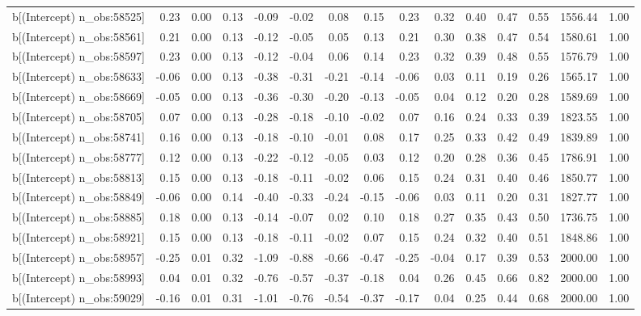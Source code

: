 \begin{table}[ht]
\begin{tabular}{rrrrrrrrrrrrrrr}
  b[(Intercept) n\_obs:58525] & 0.23 & 0.00 & 0.13 & -0.09 & -0.02 & 0.08 & 0.15 & 0.23 & 0.32 & 0.40 & 0.47 & 0.55 & 1556.44 & 1.00 \\ 
  b[(Intercept) n\_obs:58561] & 0.21 & 0.00 & 0.13 & -0.12 & -0.05 & 0.05 & 0.13 & 0.21 & 0.30 & 0.38 & 0.47 & 0.54 & 1580.61 & 1.00 \\ 
  b[(Intercept) n\_obs:58597] & 0.23 & 0.00 & 0.13 & -0.12 & -0.04 & 0.06 & 0.14 & 0.23 & 0.32 & 0.39 & 0.48 & 0.55 & 1576.79 & 1.00 \\ 
  b[(Intercept) n\_obs:58633] & -0.06 & 0.00 & 0.13 & -0.38 & -0.31 & -0.21 & -0.14 & -0.06 & 0.03 & 0.11 & 0.19 & 0.26 & 1565.17 & 1.00 \\ 
  b[(Intercept) n\_obs:58669] & -0.05 & 0.00 & 0.13 & -0.36 & -0.30 & -0.20 & -0.13 & -0.05 & 0.04 & 0.12 & 0.20 & 0.28 & 1589.69 & 1.00 \\ 
  b[(Intercept) n\_obs:58705] & 0.07 & 0.00 & 0.13 & -0.28 & -0.18 & -0.10 & -0.02 & 0.07 & 0.16 & 0.24 & 0.33 & 0.39 & 1823.55 & 1.00 \\ 
  b[(Intercept) n\_obs:58741] & 0.16 & 0.00 & 0.13 & -0.18 & -0.10 & -0.01 & 0.08 & 0.17 & 0.25 & 0.33 & 0.42 & 0.49 & 1839.89 & 1.00 \\ 
  b[(Intercept) n\_obs:58777] & 0.12 & 0.00 & 0.13 & -0.22 & -0.12 & -0.05 & 0.03 & 0.12 & 0.20 & 0.28 & 0.36 & 0.45 & 1786.91 & 1.00 \\ 
  b[(Intercept) n\_obs:58813] & 0.15 & 0.00 & 0.13 & -0.18 & -0.11 & -0.02 & 0.06 & 0.15 & 0.24 & 0.31 & 0.40 & 0.46 & 1850.77 & 1.00 \\ 
  b[(Intercept) n\_obs:58849] & -0.06 & 0.00 & 0.14 & -0.40 & -0.33 & -0.24 & -0.15 & -0.06 & 0.03 & 0.11 & 0.20 & 0.31 & 1827.77 & 1.00 \\ 
  b[(Intercept) n\_obs:58885] & 0.18 & 0.00 & 0.13 & -0.14 & -0.07 & 0.02 & 0.10 & 0.18 & 0.27 & 0.35 & 0.43 & 0.50 & 1736.75 & 1.00 \\ 
  b[(Intercept) n\_obs:58921] & 0.15 & 0.00 & 0.13 & -0.18 & -0.11 & -0.02 & 0.07 & 0.15 & 0.24 & 0.32 & 0.40 & 0.51 & 1848.86 & 1.00 \\ 
  b[(Intercept) n\_obs:58957] & -0.25 & 0.01 & 0.32 & -1.09 & -0.88 & -0.66 & -0.47 & -0.25 & -0.04 & 0.17 & 0.39 & 0.53 & 2000.00 & 1.00 \\ 
  b[(Intercept) n\_obs:58993] & 0.04 & 0.01 & 0.32 & -0.76 & -0.57 & -0.37 & -0.18 & 0.04 & 0.26 & 0.45 & 0.66 & 0.82 & 2000.00 & 1.00 \\ 
  b[(Intercept) n\_obs:59029] & -0.16 & 0.01 & 0.31 & -1.01 & -0.76 & -0.54 & -0.37 & -0.17 & 0.04 & 0.25 & 0.44 & 0.68 & 2000.00 & 1.00 \\ 

\end{tabular}
\end{table}
